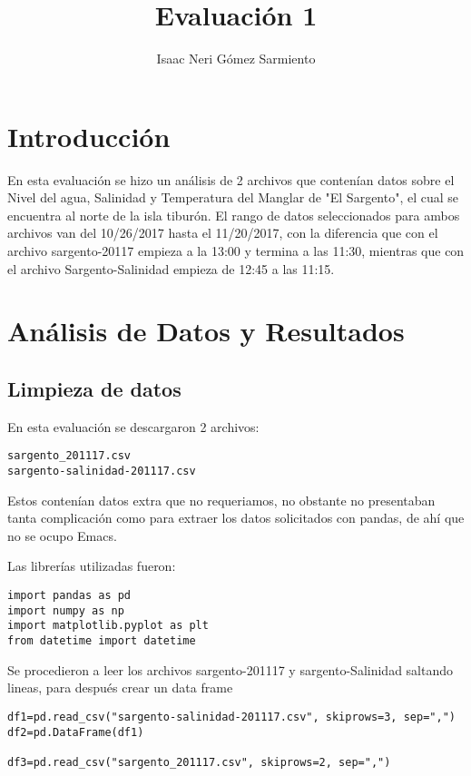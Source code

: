 \documentclass[a4paper]{article}
\title{Evaluación 1}
\author{Isaac Neri Gómez Sarmiento}
\begin{document}
\maketitle

\section{Introducción}
En esta evaluación se hizo un análisis de 2 archivos que contenían datos sobre el Nivel del agua, Salinidad y Temperatura del Manglar de "El Sargento", el cual se encuentra al norte de la isla tiburón. El rango de datos seleccionados para ambos archivos van  del 10/26/2017 hasta el 11/20/2017, con la diferencia que con el archivo sargento-20117 empieza a la 13:00 y termina a las 11:30, mientras que con el archivo Sargento-Salinidad empieza de 12:45 a las 11:15.


\section{Análisis de Datos  y Resultados}

\subsection{Limpieza de datos}
En esta evaluación se descargaron 2 archivos:
\begin{verbatim}
sargento_201117.csv
sargento-salinidad-201117.csv
\end{verbatim}

Estos contenían datos extra que no requeriamos, no obstante no presentaban tanta complicación como para extraer los datos solicitados con pandas, de ahí que no se ocupo Emacs. 

Las librerías utilizadas fueron:

\begin{verbatim}
import pandas as pd
import numpy as np
import matplotlib.pyplot as plt
from datetime import datetime
\end{verbatim}

Se procedieron a leer los archivos  sargento-201117 y sargento-Salinidad saltando lineas, para después crear un data frame

\begin{verbatim}
df1=pd.read_csv("sargento-salinidad-201117.csv", skiprows=3, sep=",")
df2=pd.DataFrame(df1)

df3=pd.read_csv("sargento_201117.csv", skiprows=2, sep=",")

\end{verbatim}
\end{document}
